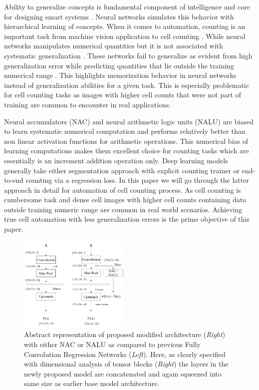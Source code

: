 \documentclass[conference]{IEEEtran}
\begin{document}
Ability to generalize concepts is fundamental component of intelligence and core for designing
smart systems \cite{b1, b2}. Neural networks simulates this behavior with hierarchical learning of concepts. When it comes to automation, counting is an important task from machine vision application \cite{b3} to cell counting \cite{b4}. While neural networks manipulates numerical quantities but it is not associated with systematic generalization \cite{b5, b6}. These networks fail to generalize as evident from high generalization error while predicting quantities that lie outside the training numerical range \cite{b7}. This highlights memorization behavior in neural networks instead of generalization abilities for a given task. This is especially problematic for cell counting tasks as images with higher cell counts that were not part of training are common to encounter in real applications.

Neural accumulators (NAC) and neural arithmetic logic units (NALU) \cite{b7} are biased to learn
systematic numerical computation and performs relatively better than non linear activation functions for arithmetic operations. This numerical bias of learning computations makes
them excellent choice for counting tasks which are essentially is an increment addition operation
only. Deep learning models generally take either segmentation approach with explicit counting trainer or end-to-end counting via a regression loss. In this paper we will go through the
latter approach \cite{b4} in detail for automation of cell counting process. As cell counting is cumbersome task and dense cell images with higher cell counts containing data outside training numeric range are common in real world scenarios. Achieving true cell automation with less generalization errors is the prime objective of this paper.

\begin{figure}[!h]
\centering
\includegraphics[width=0.47\textwidth]{abstract-rep.png}
\caption{Abstract representation of proposed modified architecture (\textit{Right}) with either NAC or NALU as compared to previous Fully Convolution Regression Networks (\textit{Left}). Here, as clearly specified with dimensional analysis of tensor blocks (\textit{Right}) the layers in the newly proposed model are concatenated and again squeezed into same size as earlier base model architecture.}
\label{fig1}
\end{figure}
\end{document}
